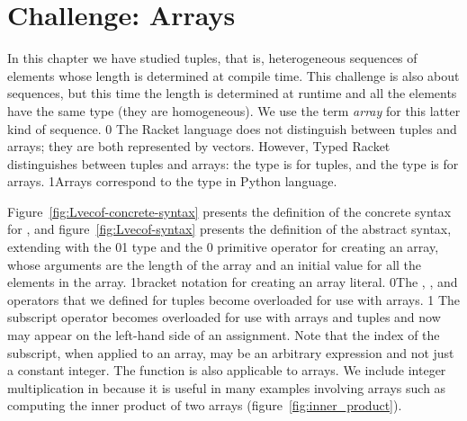 \documentclass[7x10]{TimesAPriori_MIT}%
\def\racketEd{0}
\def\pythonEd{1}
\def\edition{1}
\newcommand{\racket}[1]{{\if\edition\racketEd{#1}\fi}}
\newcommand{\pythonColor}[0]{}
\newcommand{\python}[1]{{\if\edition\pythonEd\pythonColor #1\fi}}
\numberwithin{theorem}{chapter}
\numberwithin{definition}{chapter}
\numberwithin{equation}{chapter}
\begin{document}
\section{Challenge: Arrays}
\label{sec:arrays}


In this chapter we have studied tuples, that is, heterogeneous
sequences of elements whose length is determined at compile time. This
challenge is also about sequences, but this time the length is
determined at runtime and all the elements have the same type (they
are homogeneous). We use the term \emph{array} for this latter kind of
sequence.
%
\racket{
The Racket language does not distinguish between tuples and arrays;
they are both represented by vectors. However, Typed Racket
distinguishes between tuples and arrays: the \code{Vector} type is for
tuples, and the \code{Vectorof} type is for arrays.}%
\python{Arrays correspond to the  type in Python language.}

Figure~\ref{fig:Lvecof-concrete-syntax} presents the definition of the
concrete syntax for \LangArray{}, and figure~\ref{fig:Lvecof-syntax}
presents the definition of the abstract syntax, extending \LangVec{}
with the \racket{}\python{} type and the
%
\racket{ primitive operator for creating an array,
whose arguments are the length of the array and an initial value for
all the elements in the array.}
\python{bracket notation for creating an array literal.}
\racket{The ,
, and \code{vector-ref!} operators that we defined
for tuples become overloaded for use with arrays.}
\python{
The subscript operator becomes overloaded for use with arrays and tuples
and now may appear on the left-hand side of an assignment.
Note that the index of the subscript, when applied to an array, may be an
arbitrary expression and not just a constant integer.
The \code{len} function is also applicable to arrays.
}
%
We include integer multiplication in \LangArray{} because it is
useful in many examples involving arrays such as computing the
inner product of two arrays (figure~\ref{fig:inner_product}).

\newcommand{\LarrayGrammarRacket}{
\begin{array}{lcl}
  \Type &::=& \LP \key{Vectorof}~\Type \RP \\
  \Exp &::=& \CMUL{\Exp}{\Exp}
       \MID \CMAKEVEC{\Exp}{\Exp} 
\end{array}
}
\newcommand{\LarrayASTRacket}{
\begin{array}{lcl}
  \Type &::=& \LP \key{Vectorof}~\Type \RP \\
  \Exp &::=& \MUL{\Exp}{\Exp}
       \MID \MAKEVEC{\Exp}{\Exp} 
\end{array}
}
\end{document}
